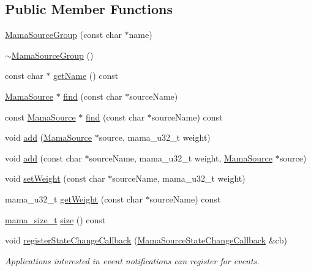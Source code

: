 \subsection*{Public Member Functions}
\begin{DoxyCompactItemize}
\item 
\hyperlink{classWombat_1_1MamaSourceGroup_a96db61f1a68dd6ff099f9c893efa0d0a}{MamaSourceGroup} (const char $\ast$name)
\item 
\hyperlink{classWombat_1_1MamaSourceGroup_a758752626dc0eb5373df787974f5371b}{$\sim$MamaSourceGroup} ()
\item 
const char $\ast$ \hyperlink{classWombat_1_1MamaSourceGroup_a6f567b63e6aa38256ccb61ec8524b968}{getName} () const 
\item 
\hyperlink{classWombat_1_1MamaSource}{MamaSource} $\ast$ \hyperlink{classWombat_1_1MamaSourceGroup_a99200a65fd0890d2bcbc312a501effae}{find} (const char $\ast$sourceName)
\item 
const \hyperlink{classWombat_1_1MamaSource}{MamaSource} $\ast$ \hyperlink{classWombat_1_1MamaSourceGroup_a89bc61394005ce432c9d3f08da98122f}{find} (const char $\ast$sourceName) const 
\item 
void \hyperlink{classWombat_1_1MamaSourceGroup_ac192ef83401db97485842beb0783864b}{add} (\hyperlink{classWombat_1_1MamaSource}{MamaSource} $\ast$source, mama\_\-u32\_\-t weight)
\item 
void \hyperlink{classWombat_1_1MamaSourceGroup_a4c92e17561c0984ac40813a6369ba2cc}{add} (const char $\ast$sourceName, mama\_\-u32\_\-t weight, \hyperlink{classWombat_1_1MamaSource}{MamaSource} $\ast$source)
\item 
void \hyperlink{classWombat_1_1MamaSourceGroup_af0433fc93cedaa7ecc8e34a2944b1b17}{setWeight} (const char $\ast$sourceName, mama\_\-u32\_\-t weight)
\item 
mama\_\-u32\_\-t \hyperlink{classWombat_1_1MamaSourceGroup_a32860f8fd7f6030dd6ed3ee698c600a6}{getWeight} (const char $\ast$sourceName) const 
\item 
\hyperlink{classmama__size__t}{mama\_\-size\_\-t} \hyperlink{classWombat_1_1MamaSourceGroup_a6f661e62632d3ebc68ff768c976dc4e6}{size} () const 
\item 
void \hyperlink{classWombat_1_1MamaSourceGroup_ac90efed56c8eba034a4d5c034710e637}{registerStateChangeCallback} (\hyperlink{classWombat_1_1MamaSourceStateChangeCallback}{MamaSourceStateChangeCallback} \&cb)
\begin{DoxyCompactList}\small\item\em Applications interested in event notifications can register for events. \item\end{DoxyCompactList}\item 

\end{DoxyCompactItemize}
